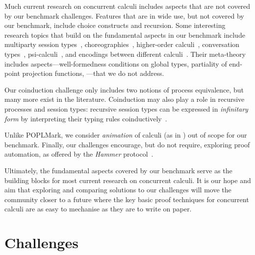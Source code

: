 \documentclass[runningheads]{llncs}
\begin{document}
Much current research on concurrent calculi includes aspects that are not covered by our benchmark challenges.
Features that are in wide use, but not covered by our benchmark, include choice constructs and recursion.
Some interesting research topics that build on the fundamental aspects in our benchmark include multiparty session types~\cite{10.1145/2827695}, choreographies~\cite{Carbone2013}, higher-order calculi~\cite{Hirsch2022}, conversation types~\cite{DBLP:journals/tcs/CairesV10}, psi-calculi~\cite{lmcs:696}, and encodings between different calculi~\cite{DBLP:journals/iandc/Gorla10,DBLP:journals/iandc/DardhaGS17}.
Their meta-theory includes aspects---\eg well-formedness conditions on global types, partiality of end-point projection functions, \etc---that we do not address.

Our coinduction challenge only includes two notions of process equivalence, but many more exist in the literature.
Coinduction may also play a role in recursive processes and session types: recursive session types can be expressed in \emph{infinitary form} by interpreting their typing rules coinductively~\cite{DerakhshanPfenning22,HornePadovani23}.

Unlike POPLMark, we consider \emph{animation} of calculi (as in \cite{Castro-Perez2021}) out of scope for our benchmark.
Finally, our challenges encourage, but do not require, exploring proof automation, as offered by \eg the \emph{Hammer} protocol~\cite{BohmeN10,CzajkaK18}.

Ultimately, the fundamental aspects covered by our benchmark serve as the building blocks for most current research on concurrent calculi.
It is our hope and aim that exploring and comparing solutions to our challenges will move the community closer to a future where the key basic proof techniques for concurrent calculi are as easy to mechanise as they are to write on paper.




\clearpage
\appendix
\section{Challenges}\label{app:challenges}

\end{document}
